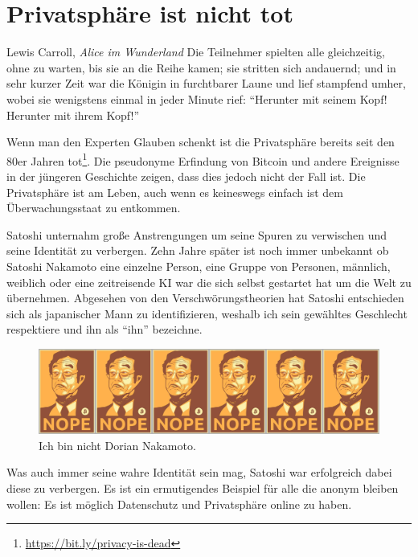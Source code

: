 \chapter{Privatsphäre ist nicht tot}
\label{les:19}

\begin{chapquote}{Lewis Carroll, \textit{Alice im Wunderland}}
Die Teilnehmer spielten alle gleichzeitig, ohne zu warten, bis sie an die Reihe
kamen; sie stritten sich andauernd; und in sehr kurzer Zeit war die Königin in
furchtbarer Laune und lief stampfend umher, wobei sie wenigstens einmal in jeder
Minute rief: \enquote{Herunter mit seinem Kopf! Herunter mit ihrem Kopf!}
\end{chapquote}

Wenn man den Experten Glauben schenkt ist die Privatsphäre bereits seit den 80er
Jahren tot\footnote{\url{https://bit.ly/privacy-is-dead}}. Die pseudonyme
Erfindung von Bitcoin und andere Ereignisse in der jüngeren Geschichte zeigen,
dass dies jedoch nicht der Fall ist. Die Privatsphäre ist am Leben, auch wenn es
keineswegs einfach ist dem Überwachungsstaat zu entkommen.

Satoshi unternahm große Anstrengungen um seine Spuren zu verwischen und seine
Identität zu verbergen. Zehn Jahre später ist noch immer unbekannt ob Satoshi
Nakamoto eine einzelne Person, eine Gruppe von Personen, männlich, weiblich oder
eine zeitreisende KI war die sich selbst gestartet hat um die Welt zu
übernehmen. Abgesehen von den Verschwörungstheorien hat Satoshi entschieden sich
als japanischer Mann zu identifizieren, weshalb ich sein gewähltes Geschlecht
respektiere und ihn als \enquote{ihn} bezeichne.

\begin{figure}
  \includegraphics{assets/images/nope.png}
  \caption{Ich bin nicht Dorian Nakamoto.}
  \label{fig:nope}
\end{figure}

Was auch immer seine wahre Identität sein mag, Satoshi war erfolgreich dabei
diese zu verbergen. Es ist ein ermutigendes Beispiel für alle die anonym bleiben
wollen: Es ist möglich Datenschutz und Privatsphäre online zu haben.

